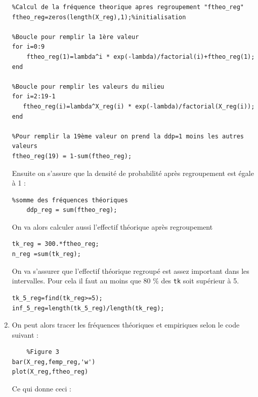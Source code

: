 \documentclass[a4paper,oneside]{article}
\begin{document}
\begin{enumerate}
\begin{lstlisting}
%Calcul de la fréquence theorique apres regroupement "ftheo_reg"
ftheo_reg=zeros(length(X_reg),1);%initialisation

%Boucle pour remplir la 1ère valeur
for i=0:9 
    ftheo_reg(1)=lambda^i * exp(-lambda)/factorial(i)+ftheo_reg(1);
end

%Boucle pour remplir les valeurs du milieu
for i=2:19-1
   ftheo_reg(i)=lambda^X_reg(i) * exp(-lambda)/factorial(X_reg(i));
end    

%Pour remplir la 19ème valeur on prend la ddp=1 moins les autres valeurs
ftheo_reg(19) = 1-sum(ftheo_reg);
\end{lstlisting}


Ensuite on s'assure que la densité de probabilité après regroupement est égale à 1 :

\begin{lstlisting}
%somme des fréquences théoriques
	ddp_reg = sum(ftheo_reg);
\end{lstlisting}


On va alors calculer aussi l'effectif théorique après regroupement 

\begin{lstlisting}
tk_reg = 300.*ftheo_reg;
n_reg =sum(tk_reg);

\end{lstlisting}

On va s'assurer que l'effectif théorique regroupé est assez important dans les intervalles. Pour cela il faut au moins que 80 $\%$ des \verb?tk? soit supérieur à 5.

\begin{lstlisting}
tk_5_reg=find(tk_reg>=5);
inf_5_reg=length(tk_5_reg)/length(tk_reg);
\end{lstlisting}

\newpage
\item

On peut alors tracer les fréquences théoriques et empiriques selon le code suivant :

\begin{lstlisting}
	%Figure 3
bar(X_reg,femp_reg,'w')
plot(X_reg,ftheo_reg)
\end{lstlisting}

Ce qui donne ceci :


\end{enumerate}
\end{document}
